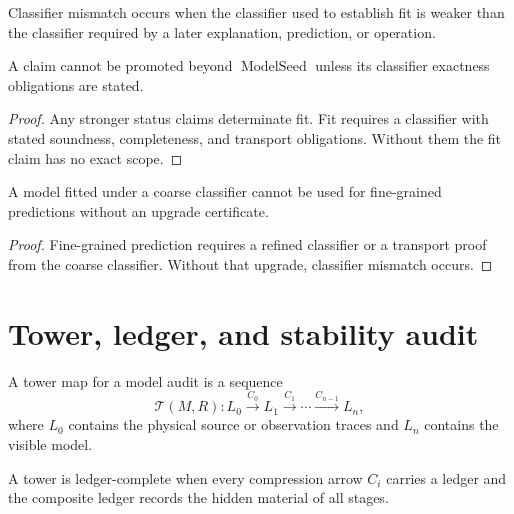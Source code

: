 \begin{definition}
\label{def:classifier-mismatch-audit}
Classifier mismatch occurs when the classifier used to establish fit is weaker than the classifier required by a later explanation, prediction, or operation.
\end{definition}

\begin{theorem}
\label{thm:classifier-obligations-promoted-fit}
A claim cannot be promoted beyond $\operatorname{ModelSeed}$ unless its classifier exactness obligations are stated.
\end{theorem}

\begin{proof}
Any stronger status claims determinate fit. Fit requires a classifier with stated soundness, completeness, and transport obligations. Without them the fit claim has no exact scope.
\end{proof}

\begin{corollary}
\label{cor:coarse-fit-not-fine-conclusions}
A model fitted under a coarse classifier cannot be used for fine-grained predictions without an upgrade certificate.
\end{corollary}

\begin{proof}
Fine-grained prediction requires a refined classifier or a transport proof from the coarse classifier. Without that upgrade, classifier mismatch occurs.
\end{proof}

\section{Tower, ledger, and stability audit}
\label{sec:tower-ledger-stability-audit}

\begin{definition}
\label{def:tower-map-audit}
A tower map for a model audit is a sequence
$$
\mathcal T(M,R):
L_0
\xrightarrow{C_0}
L_1
\xrightarrow{C_1}
\cdots
\xrightarrow{C_{n-1}}
L_n,
$$
where $L_0$ contains the physical source or observation traces and $L_n$ contains the visible model.
\end{definition}

\begin{definition}
\label{def:ledger-complete-tower-audit}
A tower is ledger-complete when every compression arrow $C_i$ carries a ledger and the composite ledger records the hidden material of all stages.
\end{definition}

